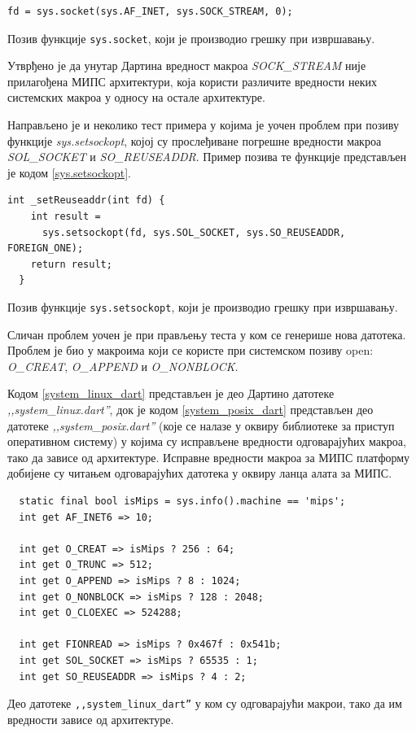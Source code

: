 \documentclass[12pt,oneside]{memoir}
\begin{document}
\begin{listing}
\begin{verbatim}
fd = sys.socket(sys.AF_INET, sys.SOCK_STREAM, 0);
\end{verbatim}
\caption{Позив функције \texttt{sys.socket}, који је производио грешку при извршавању.}
\label{sys.socket}
\end{listing}

Утврђено је да унутар Дартина вредност макроа \textit{SOCK\_STREAM} није прилагођена МИПС архитектури, која користи различите вредности неких системских макроа у односу на остале архитектуре.

Направљено је и неколико тест примера у којима је уочен проблем при позиву функције \textit{sys.setsockopt}, којој су прослеђиване погрешне вредности макроа \textit{SOL\_SOCKET} и \textit{SO\_REUSEADDR}. Пример позива те функције представљен је кодом \ref{sys.setsockopt}.\\

\begin{listing}
\begin{verbatim}
int _setReuseaddr(int fd) {
    int result =
      sys.setsockopt(fd, sys.SOL_SOCKET, sys.SO_REUSEADDR, FOREIGN_ONE);
    return result;
  }
\end{verbatim}
\caption{Позив функције \texttt{sys.setsockopt}, који је производио грешку при извршавању.}
\label{sys.setsockopt}
\end{listing}

Сличан проблем уочен је при прављењу теста у ком се генерише нова датотека. Проблем је био у макроима који се користе при системском позиву open: \textit{O\_CREAT}, \textit{O\_APPEND} и \textit{O\_NONBLOCK}.

Кодом \ref{system_linux_dart} представљен је део Дартино датотеке \textit{,,system\_linux.dart''}, док је кодом \ref{system_posix_dart} представљен део датотеке \textit{,,system\_posix.dart''} (које се налазе у оквиру библиотеке за приступ оперативном систему) у којима су исправљене вредности одговарајућих макроа, тако да зависе од архитектуре. Исправне вредности макроа за МИПС платформу добијене су читањем одговарајућих датотека у оквиру ланца алата за МИПС. \\

\begin{listing}
\begin{verbatim}
  static final bool isMips = sys.info().machine == 'mips';
  int get AF_INET6 => 10;

  int get O_CREAT => isMips ? 256 : 64;
  int get O_TRUNC => 512;
  int get O_APPEND => isMips ? 8 : 1024;
  int get O_NONBLOCK => isMips ? 128 : 2048;
  int get O_CLOEXEC => 524288;

  int get FIONREAD => isMips ? 0x467f : 0x541b;
  int get SOL_SOCKET => isMips ? 65535 : 1;
  int get SO_REUSEADDR => isMips ? 4 : 2;
\end{verbatim}
\caption{Део датотеке \texttt{,,system\_linux\_dart''} у ком су одговарајући макрои, тако да им вредности зависе од архитектуре.}
\label{system_linux_dart}
\end{listing}
\end{document}
